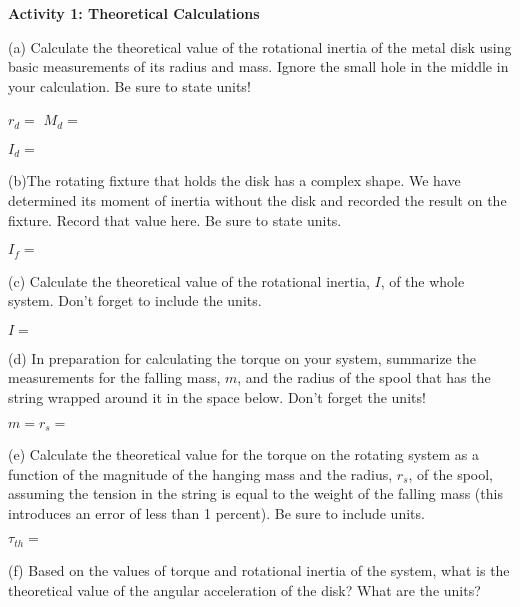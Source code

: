 \textbf{Activity 1: Theoretical Calculations }

(a) Calculate the theoretical value of the rotational inertia of the metal disk
using basic measurements of its radius and mass. Ignore the small hole in the
middle in your calculation. Be sure to state units!
\vspace{5mm}

\( r_{d} =\) \hfill{}\( M_{d}= \) \hfill{}
\vspace{5mm}

\( I_{d}= \) 
\vspace{5mm}

(b)The rotating fixture that holds the disk has a complex shape. We have determined
its moment of inertia without the disk and recorded the result on the fixture.
Record that value here. Be sure to state units.
\vspace{5mm}

\( I_{f} =\) 
\vspace{5mm}

(c) Calculate the theoretical value of the rotational inertia, $I$, of the whole
system. Don't forget to include the units.
\vspace{5mm}

$I =$
\vspace{5mm}

(d) In preparation for calculating the torque on your system, summarize the
measurements for the falling mass, $m$, and the radius of the spool that has the
string wrapped around it in the space below. Don't forget the units!
\vspace{5mm}

$m = $\hfill{}\(r_{s}= \)\hfill{} 
\vspace{5mm}

(e) Calculate the theoretical value for the torque on the rotating system as
a function of the magnitude of the hanging mass and the radius, \( r_{s} \),
of the spool, assuming the tension in the string is equal to the weight of the falling mass (this introduces an error of less than 1 percent).  Be sure to include units.
\vspace{5mm}

\( \tau _{th}= \)
\vspace{5mm}

(f) Based on the values of torque and rotational inertia of the system, what
is the theoretical value of the angular acceleration of the disk? What are the
units? 
\vspace{5mm}

